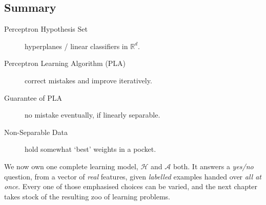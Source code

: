 \hrulebar

\subsection*{Summary}

\begin{description}
    \item[Perceptron Hypothesis Set] hyperplanes / linear classifiers in
        \(\mathbb{R}^d\).
    \item[Perceptron Learning Algorithm (PLA)] correct mistakes and improve
        iteratively.
    \item[Guarantee of PLA] no mistake eventually, if linearly separable.
    \item[Non-Separable Data] hold somewhat `best' weights in a pocket.
\end{description}

We now own one complete learning model, \(\mathcal{H}\) and \(\mathcal{A}\)
both. It answers a \emph{yes/no} question, from a vector of \emph{real}
features, given \emph{labelled} examples handed over \emph{all at once}. Every
one of those emphasised choices can be varied, and the next chapter takes stock
of the resulting zoo of learning problems.
